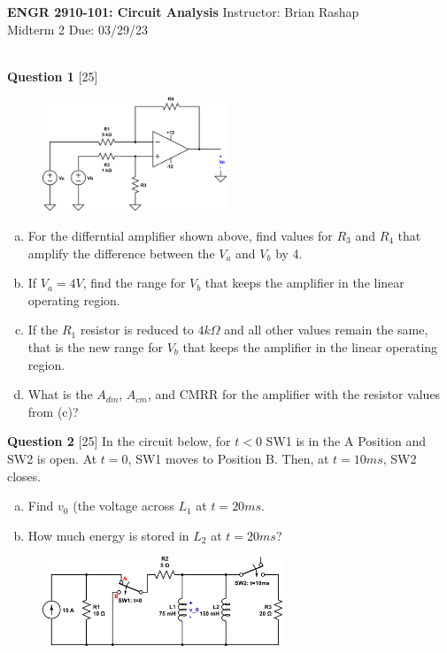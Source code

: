 \documentclass[12pt]{article}
\begin{document}
\begin{center}
\hfil
{\large\bf {ENGR 2910-101: Circuit Analysis}}
\hfill Instructor: Brian Rashap\\
Midterm 2  \hfill Due: 03/29/23\\
\hrulefill\\
\end{center}

{\bf Question 1} [25]
\newline

\begin{figure}[h!]
\centering 
\includegraphics[clip,width=0.49\textwidth]{mid2_1.png}
\end{figure}

\begin{enumerate}[(a)]
\item For the differntial amplifier shown above, find values for $R_3$ and $R_4$ that amplify the difference between the $V_a$ and $V_b$ by 4.
\item If $V_a = 4V$, find the range for $V_b$ that keeps the amplifier in the linear operating region.
\item If the $R_1$ resistor is reduced to $4k\Omega$ and all other values remain the same, that is the new range for $V_b$ that keeps the amplifier in the linear operating region.
\item What is the $A_{dm}$, $A_{cm}$, and CMRR for the amplifier with the resistor values from (c)?
\end{enumerate}

{\bf Question 2} [25] 
\newline
In the circuit below, for $t<0$ SW1 is in the A Position and SW2 is open. At $t=0$, SW1 moves to Position B. Then, at $t = 10ms$, SW2 closes. 
\begin{enumerate}[(a)]
\item Find $v_0$ (the voltage across $L_1$ at $t = 20ms$.
\item How much energy is stored in $L_2$ at $t = 20ms$?
\end{enumerate}

\begin{figure}[h!]
  \centering 
 \vspace{-0.1in}
 \includegraphics[clip,width=0.64\textwidth]{mid2_2.png}
\vspace{-0.1in}
\end{figure}
\end{document}
